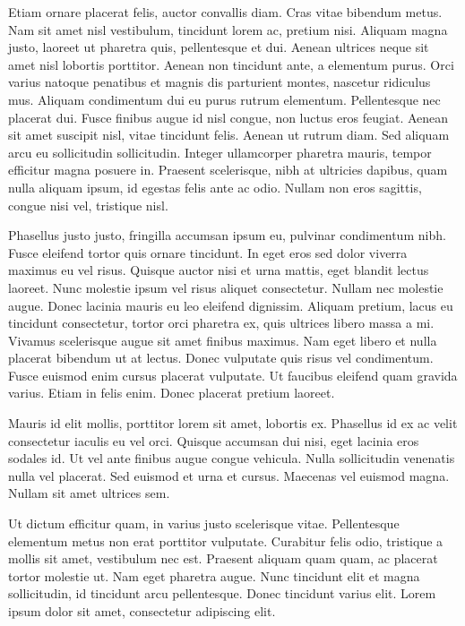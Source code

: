 \documentclass{article}
\begin{document}
Etiam ornare placerat felis, auctor convallis diam. Cras vitae bibendum metus. Nam sit amet nisl vestibulum, tincidunt lorem ac, pretium nisi. Aliquam magna justo, laoreet ut pharetra quis, pellentesque et dui. Aenean ultrices neque sit amet nisl lobortis porttitor. Aenean non tincidunt ante, a elementum purus. Orci varius natoque penatibus et magnis dis parturient montes, nascetur ridiculus mus. Aliquam condimentum dui eu purus rutrum elementum. Pellentesque nec placerat dui. Fusce finibus augue id nisl congue, non luctus eros feugiat. Aenean sit amet suscipit nisl, vitae tincidunt felis. Aenean ut rutrum diam. Sed aliquam arcu eu sollicitudin sollicitudin. Integer ullamcorper pharetra mauris, tempor efficitur magna posuere in. Praesent scelerisque, nibh at ultricies dapibus, quam nulla aliquam ipsum, id egestas felis ante ac odio. Nullam non eros sagittis, congue nisi vel, tristique nisl.

Phasellus justo justo, fringilla accumsan ipsum eu, pulvinar condimentum nibh. Fusce eleifend tortor quis ornare tincidunt. In eget eros sed dolor viverra maximus eu vel risus. Quisque auctor nisi et urna mattis, eget blandit lectus laoreet. Nunc molestie ipsum vel risus aliquet consectetur. Nullam nec molestie augue. Donec lacinia mauris eu leo eleifend dignissim. Aliquam pretium, lacus eu tincidunt consectetur, tortor orci pharetra ex, quis ultrices libero massa a mi. Vivamus scelerisque augue sit amet finibus maximus. Nam eget libero et nulla placerat bibendum ut at lectus. Donec vulputate quis risus vel condimentum. Fusce euismod enim cursus placerat vulputate. Ut faucibus eleifend quam gravida varius. Etiam in felis enim. Donec placerat pretium laoreet.

Mauris id elit mollis, porttitor lorem sit amet, lobortis ex. Phasellus id ex ac velit consectetur iaculis eu vel orci. Quisque accumsan dui nisi, eget lacinia eros sodales id. Ut vel ante finibus augue congue vehicula. Nulla sollicitudin venenatis nulla vel placerat. Sed euismod et urna et cursus. Maecenas vel euismod magna. Nullam sit amet ultrices sem.

Ut dictum efficitur quam, in varius justo scelerisque vitae. Pellentesque elementum metus non erat porttitor vulputate. Curabitur felis odio, tristique a mollis sit amet, vestibulum nec est. Praesent aliquam quam quam, ac placerat tortor molestie ut. Nam eget pharetra augue. Nunc tincidunt elit et magna sollicitudin, id tincidunt arcu pellentesque. Donec tincidunt varius elit. Lorem ipsum dolor sit amet, consectetur adipiscing elit.
\end{document}
